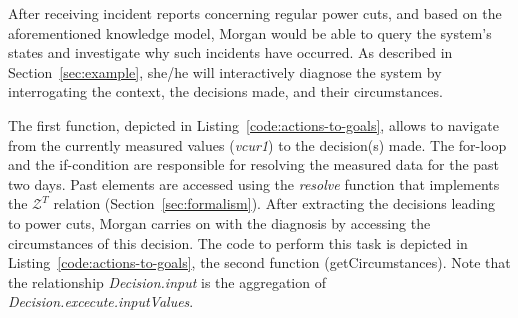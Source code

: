 %




After receiving incident reports concerning regular power cuts, and based on the aforementioned knowledge model, Morgan would be able to query the system's states and investigate why such incidents have occurred.
As described in Section~\ref{sec:example}, she/he will interactively diagnose the system by interrogating the context, the decisions made, and their circumstances.

The first function, depicted in Listing~\ref{code:actions-to-goals}, allows  to navigate from the currently measured values (\textit{vcur1}) to the decision(s) made. The for-loop and the if-condition are responsible for resolving the measured data for the past two days. 
Past elements are accessed using the \textit{resolve} function that implements the $\mathcal{Z}^T$ relation (\cf Section~\ref{sec:formalism}).
After extracting the decisions leading to power cuts, Morgan carries on with the diagnosis by accessing the circumstances of this decision. The code to perform this task is depicted in Listing~\ref{code:actions-to-goals}, the second function (getCircumstances).
Note that the relationship \textit{Decision.input} is the aggregation of \textit{Decision.excecute.inputValues}.

